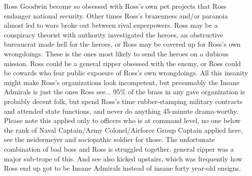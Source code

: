 \documentclass[12pt]{book}
\begin{document}
Ross Goodwin become so obsessed with Ross's own pet projects that Ross endanger national security. Other times Ross's brazenness and/or paranoia almost led to wars broke out between rival superpowers. Ross may be a conspiracy theorist with authority investigated the heroes, an obstructive bureaucrat made hell for the heroes, or Ross may be covered up for Ross's own wrongdoings. These is the ones most likely to send the heroes on a dubious mission. Ross could be a general ripper obsessed with the enemy, or Ross could be cowards who fear public exposure of Ross's own wrongdoings. All this insanity might make Ross's organizations look incompetent, but presumably the Insane Admirals is just the ones Ross see... 95\% of the brass in any gave organization is probably decent folk, but spend Ross's time rubber-stamping military contracts and attended state functions, and never do anything 45-minute drama-worthy. Please note this applied only to officers who is at command level, no one below the rank of Naval Captain/Army Colonel/Airforce Group Captain applied here, see the neidermeyer and sociopathic soldier for those. The unfortunate combination of bad boss and Ross is struggled together. general ripper was a major sub-trope of this. And see also kicked upstairs, which was frequently how Ross end up got to be Insane Admirals instead of insane forty year-old ensigns.
\end{document}
